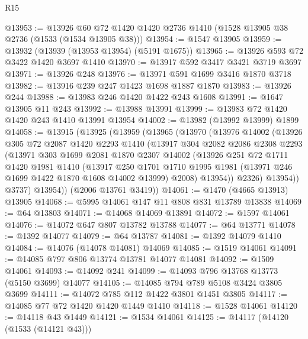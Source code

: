 \begin{lexlean}{R15}
\begin{coremodule}
@13953 := @13926 @60 @72 @1420 @1420 @2736 @1410 (@1528 @13905 @38 @2736 (@1533 (@1534 @13905 @38)))
@13954 := @1547 @13905
@13959 := @13932 (@13939 (@13953 @13954) (@5191 @1675))
@13965 := @13926 @593 @72 @3422 @1420 @3697 @1410
@13970 := @13917 @592 @3417 @3421 @3719 @3697
@13971 := @13926 @248
@13976 := @13971 @591 @1699 @3416 @1870 @3718
@13982 := @13916 @239 @247 @1423 @1698 @1887 @1870
@13983 := @13926 @244
@13988 := @13983 @246 @1420 @1422 @243 @1608
@13991 := @1647 @13905 @11 @243
@13992 := @13988 @13991
@13999 := @13983 @72 @1420 @1420 @243 @1410 @13991 @13954
@14002 := @13982 (@13992 @13999) @1899
@14058 := @13915
    (@13925
      (@13959
        (@13965
          (@13970
            (@13976
              @14002
              (@13926
                @305
                @72
                @2087
                @1420
                @2293
                @1410
                (@13917
                  @304
                  @2082
                  @2086
                  @2308
                  @2293
                  (@13971
                    @303
                    @1699
                    @2081
                    @1870
                    @2307
                    @14002
                    (@13926
                      @251
                      @72
                      @1711
                      @1420
                      @1981
                      @1410
                      (@13917
                        @250
                        @1701
                        @1710
                        @1995
                        @1981
                        (@13971 @246 @1699 @1422 @1870 @1608 @14002 @13999)
                        @2008)
                      @13954))
                  @2326)
                @13954))
            @3737)
          @13954))
      (@2006 @13761 @3419))
@14061 := @1470 (@4665 @13913) @13905
@14068 := @5995 @14061 @147 @11 @808 @831 @13789 @13838
@14069 := @64 @13803
@14071 := @14068 @14069 @13891
@14072 := @1597 @14061
@14076 := @14072 @647 @807 @13782 @13788
@14077 := @64 @13771
@14078 := @1392 @14077
@14079 := @64 @13787
@14081 := @1392 @14079 @1410
@14084 := @14076 (@14078 @14081) @14069
@14085 := @1519 @14061
@14091 := @14085 @797 @806 @13774 @13781 @14077 @14081
@14092 := @1509 @14061
@14093 := @14092 @241
@14099 := @14093 @796 @13768 @13773 (@5150 @3699) @14077
@14105 := @14085 @794 @789 @5108 @3424 @3805 @3699
@14111 := @14072 @785 @112 @1422 @3801 @1451 @3805
@14117 := @14085 @77 @72 @1420 @1420 @1449 @1410
@14118 := @1528 @14061
@14120 := @14118 @43 @1449
@14121 := @1534 @14061
@14125 := @14117 (@14120 (@1533 (@14121 @43)))

\end{coremodule}
\end{lexlean}

